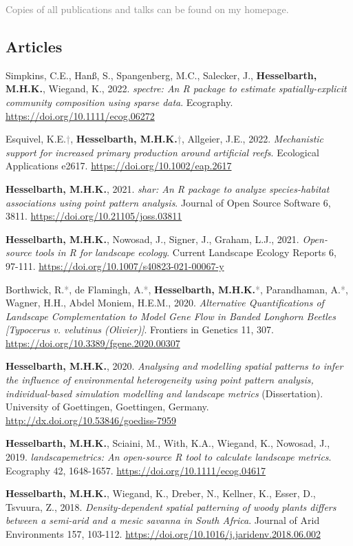 \documentclass[hidelinks]{report}
\begin{document}
\textcolor{grey}{\footnotesize{Copies of all publications and talks can be found on my homepage.}}

\subsection*{Articles}

\begin{hangparas}{7.5mm}{1}

Simpkins, C.E., Hanß, S., Spangenberg, M.C., Salecker, J., \textbf{Hesselbarth, M.H.K.}, Wiegand, K., 2022. \textit{spectre: An R package to estimate spatially-explicit community composition using sparse data}. Ecography. \url{https://doi.org/10.1111/ecog.06272}

Esquivel, K.E.\textcolor{grey}{†}, \textbf{Hesselbarth, M.H.K.}\textcolor{grey}{†}, Allgeier, J.E., 2022. \textit{Mechanistic support for increased primary production around artificial reefs}. Ecological Applications e2617. \url{https://doi.org/10.1002/eap.2617}

\textbf{Hesselbarth, M.H.K.}, 2021. \textit{shar: An R package to analyze species-habitat associations using point pattern analysis}. Journal of Open Source Software 6, 3811. \url{https://doi.org/10.21105/joss.03811}

\textbf{Hesselbarth, M.H.K.}, Nowosad, J., Signer, J., Graham, L.J., 2021. \textit{Open-source tools in R for landscape ecology}. Current Landscape Ecology Reports 6, 97-111. \url{https://doi.org/10.1007/s40823-021-00067-y}

Borthwick, R.\textcolor{grey}{*}, de Flamingh, A.\textcolor{grey}{*}, \textbf{Hesselbarth, M.H.K.}\textcolor{grey}{*}, Parandhaman, A.\textcolor{grey}{*}, Wagner, H.H., Abdel Moniem, H.E.M., 2020. \textit{Alternative Quantifications of Landscape Complementation to Model Gene Flow in Banded Longhorn Beetles [Typocerus v. velutinus (Olivier)]}. Frontiers in Genetics 11, 307. \url{https://doi.org/10.3389/fgene.2020.00307}

\textbf{Hesselbarth, M.H.K.}, 2020. \textit{Analysing and modelling spatial patterns to infer the influence of environmental heterogeneity using point pattern analysis, individual-based simulation modelling and landscape metrics} (Dissertation). University of Goettingen, Goettingen, Germany. \url{http://dx.doi.org/10.53846/goediss-7959}

\textbf{Hesselbarth, M.H.K.}, Sciaini, M., With, K.A., Wiegand, K., Nowosad, J., 2019. \textit{landscapemetrics: An open-source R tool to calculate landscape metrics}. Ecography 42, 1648-1657. \url{https://doi.org/10.1111/ecog.04617}

\textbf{Hesselbarth, M.H.K.}, Wiegand, K., Dreber, N., Kellner, K., Esser, D., Tsvuura, Z., 2018. \textit{Density-dependent spatial patterning of woody plants differs between a semi-arid and a mesic savanna in South Africa}. Journal of Arid Environments 157, 103-112. \url{https://doi.org/10.1016/j.jaridenv.2018.06.002}

\end{hangparas}
\end{document}
